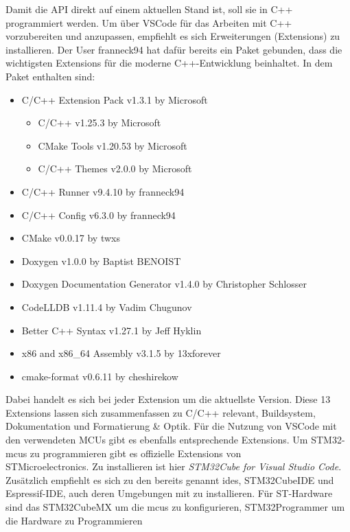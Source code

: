 Damit die API direkt auf einem aktuellen Stand ist, soll sie in C++ programmiert werden.
Um über VSCode für das Arbeiten mit C++ vorzubereiten und anzupassen, empfiehlt es sich Erweiterungen (Extensions) zu installieren.
Der User franneck94 hat dafür bereits ein Paket gebunden, dass die wichtigsten Extensions für die moderne C++-Entwicklung beinhaltet.
In dem Paket enthalten sind:
\begin{itemize}
	\item C/C++ Extension Pack  v1.3.1 by Microsoft
	\begin{itemize}
		\item C/C++  v1.25.3  by Microsoft		
		\item CMake Tools  v1.20.53  by Microsoft
		\item C/C++ Themes  v2.0.0 by Microsoft 
	\end{itemize}
	\item C/C++ Runner  v9.4.10 by franneck94
	\item C/C++ Config  v6.3.0 by franneck94
	\item CMake  v0.0.17 by twxs
	\item Doxygen  v1.0.0 by Baptist BENOIST
	\item Doxygen Documentation Generator  v1.4.0 by Christopher Schlosser
	\item CodeLLDB  v1.11.4 by Vadim Chugunov
	\item Better C++ Syntax  v1.27.1  by Jeff Hyklin
	\item x86 and x86\_64 Assembly  v3.1.5 by 13xforever
	\item cmake-format  v0.6.11 by cheshirekow
\end{itemize}

Dabei handelt es sich bei jeder Extension um die aktuellste Version.
Diese 13 Extensions lassen sich zusammenfassen zu C/C++ relevant, Buildsystem, Dokumentation und Formatierung \& Optik.
Für die Nutzung von VSCode mit den verwendeten MCUs gibt es ebenfalls entsprechende Extensions.
Um STM32-\gls{mcu}s zu programmieren gibt es offizielle Extensions von\\STMicroelectronics.
Zu installieren ist hier \emph{STM32Cube for Visual Studio Code}.
Zusätzlich empfiehlt es sich zu den bereits genannt \gls{ide}s, STM32CubeIDE und Espressif-IDE, auch deren Umgebungen mit zu installieren.
Für ST-Hardware sind das STM32CubeMX um die \gls{mcu}s zu konfigurieren, STM32Programmer um die Hardware zu Programmieren %


